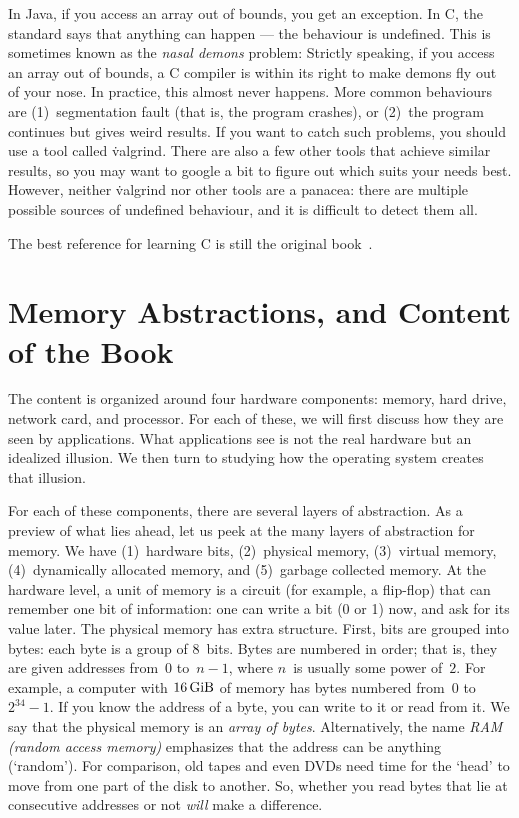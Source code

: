 In Java, if you access an array out of bounds, you get an exception.
In C, the standard says that anything can happen ---
  the behaviour is undefined.
This is sometimes known as the \emph{nasal demons} problem:
  Strictly speaking,
  if you access an array out of bounds,
  a C compiler is within its right to make demons fly out of your nose.
In practice, this almost never happens.
More common behaviours are
  (1)~segmentation fault (that is, the program crashes), or
  (2)~the program continues but gives weird results.
If you want to catch such problems,
  you should use a tool called \.{valgrind}.
There are also a few other tools that achieve similar results,
  so you may want to google a bit to figure out which suits your needs best.
However, neither \.{valgrind} nor other tools are a panacea:
  there are multiple possible sources of undefined behaviour,
  and it is difficult to detect them all.

\smallskip

The best reference for learning C is still the original book~\citep{c-book}.

\section{Memory Abstractions, and Content of the Book}

The content is organized around four hardware components:
  memory, hard drive, network card, and processor.
For each of these,
  we will first discuss how they are seen by applications.
What applications see is not the real hardware but an idealized illusion.
We then turn to studying how the operating system creates that illusion.

For each of these components, there are several layers of abstraction.
As a preview of what lies ahead, let us peek at the many layers of abstraction for memory.
We have (1)~hardware bits, (2)~physical memory, (3)~virtual memory, (4)~dynamically allocated memory, and (5)~garbage collected memory.
At the hardware level, a unit of memory is a circuit (for example, a flip-flop) that can remember one bit of information: one can write a bit (0 or 1) now, and ask for its value later.
The physical memory has extra structure.
First, bits are grouped into bytes: each byte is a group of 8~bits.
Bytes are numbered in order; that is, they are given addresses from~$0$ to~$n-1$, where $n$~is usually some power of~$2$.
For example, a computer with $16\,\rm GiB$ of memory has bytes numbered from~$0$ to~$2^{34}-1$.
If you know the address of a byte, you can write to it or read from it.
We say that the physical memory is an \emph{array of bytes}.
Alternatively, the name \emph{RAM (random access memory)} emphasizes that the address can be anything (`random').
For comparison, old tapes and even DVDs need time for the `head' to move from one part of the disk to another.
So, whether you read bytes that lie at consecutive addresses or not \emph{will} make a difference.


